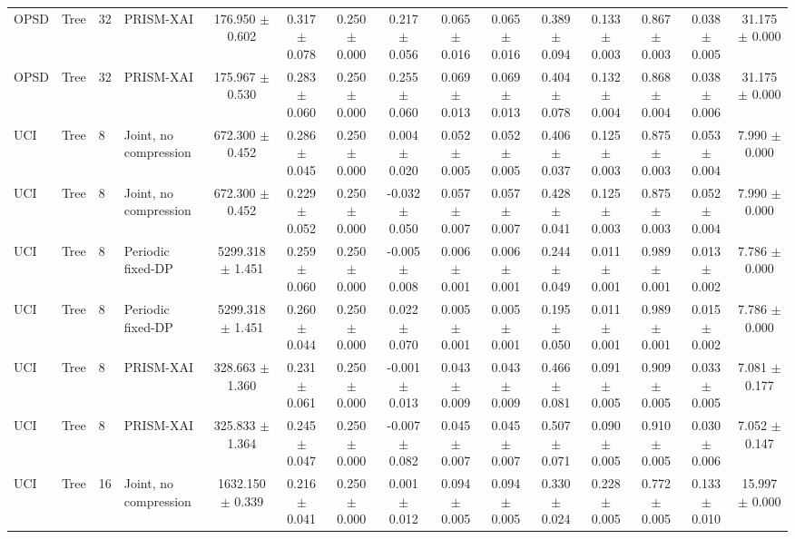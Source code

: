 \begin{table}[t]
\begin{tabular}{llllccccccccccc}
OPSD & Tree & 32 & PRISM-XAI & 176.950 $\pm$ 0.602 & 0.317 $\pm$ 0.078 & 0.250 $\pm$ 0.000 & 0.217 $\pm$ 0.056 & 0.065 $\pm$ 0.016 & 0.065 $\pm$ 0.016 & 0.389 $\pm$ 0.094 & 0.133 $\pm$ 0.003 & 0.867 $\pm$ 0.003 & 0.038 $\pm$ 0.005 & 31.175 $\pm$ 0.000 \\
OPSD & Tree & 32 & PRISM-XAI & 175.967 $\pm$ 0.530 & 0.283 $\pm$ 0.060 & 0.250 $\pm$ 0.000 & 0.255 $\pm$ 0.060 & 0.069 $\pm$ 0.013 & 0.069 $\pm$ 0.013 & 0.404 $\pm$ 0.078 & 0.132 $\pm$ 0.004 & 0.868 $\pm$ 0.004 & 0.038 $\pm$ 0.006 & 31.175 $\pm$ 0.000 \\
UCI & Tree & 8 & Joint, no compression & 672.300 $\pm$ 0.452 & 0.286 $\pm$ 0.045 & 0.250 $\pm$ 0.000 & 0.004 $\pm$ 0.020 & 0.052 $\pm$ 0.005 & 0.052 $\pm$ 0.005 & 0.406 $\pm$ 0.037 & 0.125 $\pm$ 0.003 & 0.875 $\pm$ 0.003 & 0.053 $\pm$ 0.004 & 7.990 $\pm$ 0.000 \\
UCI & Tree & 8 & Joint, no compression & 672.300 $\pm$ 0.452 & 0.229 $\pm$ 0.052 & 0.250 $\pm$ 0.000 & -0.032 $\pm$ 0.050 & 0.057 $\pm$ 0.007 & 0.057 $\pm$ 0.007 & 0.428 $\pm$ 0.041 & 0.125 $\pm$ 0.003 & 0.875 $\pm$ 0.003 & 0.052 $\pm$ 0.004 & 7.990 $\pm$ 0.000 \\
UCI & Tree & 8 & Periodic fixed-DP & 5299.318 $\pm$ 1.451 & 0.259 $\pm$ 0.060 & 0.250 $\pm$ 0.000 & -0.005 $\pm$ 0.008 & 0.006 $\pm$ 0.001 & 0.006 $\pm$ 0.001 & 0.244 $\pm$ 0.049 & 0.011 $\pm$ 0.001 & 0.989 $\pm$ 0.001 & 0.013 $\pm$ 0.002 & 7.786 $\pm$ 0.000 \\
UCI & Tree & 8 & Periodic fixed-DP & 5299.318 $\pm$ 1.451 & 0.260 $\pm$ 0.044 & 0.250 $\pm$ 0.000 & 0.022 $\pm$ 0.070 & 0.005 $\pm$ 0.001 & 0.005 $\pm$ 0.001 & 0.195 $\pm$ 0.050 & 0.011 $\pm$ 0.001 & 0.989 $\pm$ 0.001 & 0.015 $\pm$ 0.002 & 7.786 $\pm$ 0.000 \\
UCI & Tree & 8 & PRISM-XAI & 328.663 $\pm$ 1.360 & 0.231 $\pm$ 0.061 & 0.250 $\pm$ 0.000 & -0.001 $\pm$ 0.013 & 0.043 $\pm$ 0.009 & 0.043 $\pm$ 0.009 & 0.466 $\pm$ 0.081 & 0.091 $\pm$ 0.005 & 0.909 $\pm$ 0.005 & 0.033 $\pm$ 0.005 & 7.081 $\pm$ 0.177 \\
UCI & Tree & 8 & PRISM-XAI & 325.833 $\pm$ 1.364 & 0.245 $\pm$ 0.047 & 0.250 $\pm$ 0.000 & -0.007 $\pm$ 0.082 & 0.045 $\pm$ 0.007 & 0.045 $\pm$ 0.007 & 0.507 $\pm$ 0.071 & 0.090 $\pm$ 0.005 & 0.910 $\pm$ 0.005 & 0.030 $\pm$ 0.006 & 7.052 $\pm$ 0.147 \\
UCI & Tree & 16 & Joint, no compression & 1632.150 $\pm$ 0.339 & 0.216 $\pm$ 0.041 & 0.250 $\pm$ 0.000 & 0.001 $\pm$ 0.012 & 0.094 $\pm$ 0.005 & 0.094 $\pm$ 0.005 & 0.330 $\pm$ 0.024 & 0.228 $\pm$ 0.005 & 0.772 $\pm$ 0.005 & 0.133 $\pm$ 0.010 & 15.997 $\pm$ 0.000 \\

\end{tabular}
\end{table}
